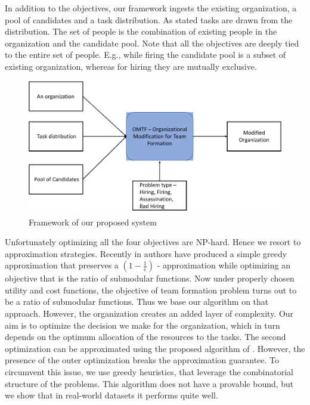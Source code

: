 In addition to the objectives, our framework ingests the existing organization, a pool of candidates and a task distribution. As stated tasks are drawn from the distribution. The set of people is the combination of existing people in the organization and the candidate pool. Note that all the objectives are deeply tied to the entire set of people. E.g., while firing the candidate pool is a subset of existing organization, whereas for hiring they are mutually exclusive.

\begin{figure}[h]
\centering
\begin{small}
\includegraphics[width=1.0\textwidth]{figs/illustration.pdf}
\caption{Framework of our proposed system}
\label{fig:hpo}
\end{small}
\end{figure} 

Unfortunately optimizing all the four objectives are NP-hard. Hence we resort to approximation strategies. Recently in \cite{bai2016algorithms} authors have produced a simple greedy approximation that preserves a $(1 - \frac{1}{e})$ - approximation while optimizing an objective that is the ratio of submodular functions. Now under properly chosen utility and cost functions, the objective of team formation problem turns out to be a ratio of submodular functions. Thus we base our algorithm on that approach. However, the organization creates an added layer of complexity. Our aim is to optimize the decision we make for the organization, which in turn depends on the optimum allocation of the resources to the tasks. The second optimization can be approximated using the proposed algorithm of \cite{bai2016algorithms}. However, the presence of the outer optimization breaks the approximation guarantee. To circumvent this issue, we use greedy heuristics, that leverage the combinatorial structure of the problems. This algorithm does not have a provable bound, but we show that in real-world datasets it performs quite well.

